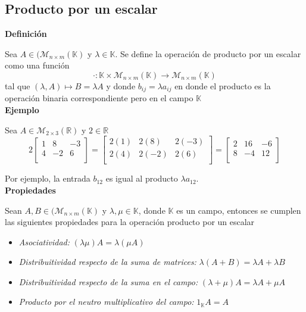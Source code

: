 \documentclass[10pt]{article}
\begin{document}
\subsection{Producto por un escalar}

\noindent\textbf{Definición}

Sea $A \in (\mathcal{M}_{n\times {m}}(\mathbb{K})$ y $\lambda \in \mathbb{K}$. Se define la operación de producto por un escalar como una función  
$$
\cdot : \mathbb{K} \times \mathcal{M}_{n\times {m}}(\mathbb{K}) \longrightarrow \mathcal{M}_{n\times {m}}(\mathbb{K})
$$
tal que $(\lambda, A) \mapsto B = \lambda A$ y donde $b_{ij} = \lambda a_{ij}$ en donde el producto es la operación binaria correspondiente pero en el campo $\mathbb{K}$ \\

\noindent\textbf{Ejemplo} 

Sea $A \in \mathcal{M}_{2\times {3}}(\mathbb{R})$ y $2 \in \mathbb{R}$
$$
2
\begin{bmatrix}
1 & 8 & -3 \\
4 & -2 & 6 \\
\end{bmatrix}
=
\begin{bmatrix}
2(1) & 2(8) & 2(-3) \\
2(4) & 2(-2) & 2(6) \\
\end{bmatrix}
=
\begin{bmatrix}
2 & 16 & -6 \\
8 & -4 & 12 \\
\end{bmatrix}
$$

Por ejemplo, la entrada $b_{12}$ es igual al producto $\lambda a_{12}$. \\

\noindent\textbf{Propiedades}


Sean $A,B \in (\mathcal{M}_{n\times {m}}(\mathbb{K})$ y $\lambda, \mu \in \mathbb{K}$, donde $\mathbb{K}$ es un campo, entonces se cumplen las siguientes propiedades para la operación producto por un escalar

\begin{itemize}
\item \textit{Asociatividad:} $(\lambda \mu)A = \lambda(\mu A)$
\item \textit{Distribuitividad respecto de la suma de matrices:} $\lambda(A+B) = \lambda A + \lambda B$
\item \textit{Distribuitividad respecto de la suma en el campo:} $(\lambda + \mu)A = \lambda A + \mu A$
\item \textit{Producto por el neutro multiplicativo del campo:} $1_{\mathbb{K}}A = A$
\end{itemize}
\end{document}
